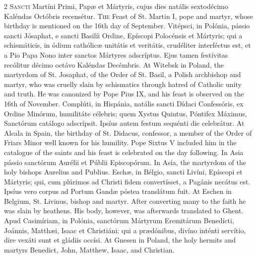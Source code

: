 \begin{paracol}{2}
\lettrine[lines=2]{S}{ancti} Martíni Primi, 
 Papæ et Mártyris, cujus dies natális sextodécimo Kaléndas Octóbris 
 recensétur.
\switchcolumn
{}
\lettrine[lines=2]{T}{he} Feast of St. Martin I, pope and 
 martyr, whose birthday is mentioned on the 16th day of September.
\switchcolumn*
{}
Vitépsci, in Polónia, 
 pássio sancti Jósaphat, e sancti Basilíi Ordine, Epíscopi Polocénsis et 
 Mártyris; qui a schismáticis, in ódium cathólicæ unitátis et veritátis, 
 crudéliter interféctus est, et a Pio Papa Nono inter sanctos Mártyres 
 adscríptus. Ejus tamen festívitas recólitur décimo octávo Kaléndas 
 Decémbris.
\switchcolumn
{}
At Witebsk in Poland, the martyrdom 
 of St. Josaphat, of the Order of St. Basil, a Polish archbishop and martyr, 
 who was cruelly slain by schismatics through hatred of Catholic unity and 
 truth. He was canonized by Pope Pius IX, and his feast is observed on 
 the 16th of November.
\switchcolumn*
{}
Complúti, in Hispánia, 
 natális sancti Dídaci Confessóris, ex Ordine Minórum, humilitáte célebris; 
 quem Xystus Quintus, Póntifex Máximus, Sanctórum catálogo adscrípsit. 
 Ipsíus autem festum sequénti die celebrátur.
\switchcolumn
{}
At Alcala in Spain, the birthday of 
 St. Didacus, confessor, a member of the Order of Friars Minor well known for 
 his humility. Pope Sixtus V included him in the catalogue of the 
 saints and his feast is celebrated on the day following.
\switchcolumn*
{}
In Asia pássio 
 sanctórum Aurélii et Públii Episcopórum.
\switchcolumn
{}
In Asia, the martyrdom of the holy 
 bishops Aurelius and Publius.
\switchcolumn*
{}
Eschæ, in Bélgio, 
 sancti Livíni, Epíscopi et Mártyris; qui, cum plúrimos ad Christi fidem 
 convertísset, a Pagánis necátus est. Ipsíus vero corpus ad Portum 
 Gandæ póstea translátum fuit.
\switchcolumn
{}
At Eschen in Belgium, St. Livinus, 
 bishop and martyr. After converting many to the faith he was slain by 
 heathens. His body, however, was afterwards translated to Ghent.
\switchcolumn*
{}
Apud Casimíriam, in 
 Polónia, sanctórum Mártyrum Eremitárum Benedícti, Joánnis, Matthæi, Isaac et 
 Christiáni; qui a prædónibus, divíno inténti servítio, dire vexáti sunt et 
 gládiis occísi.
\switchcolumn
{}
At Gnesen in Poland, the holy 
 hermits and martyrs Benedict, John, Matthew, Isaac, and Christian. 

\end{paracol}
